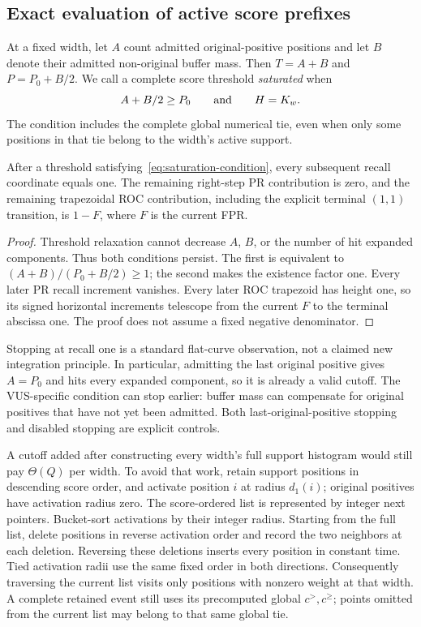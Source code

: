 \subsection{Exact evaluation of active score prefixes}
\label{sec:saturation}
At a fixed width, let $A$ count admitted original-positive positions and let
$B$ denote their admitted non-original buffer mass. Then $T=A+B$ and
$P=P_0+B/2$. We call a complete score threshold \emph{saturated} when
\begin{equation}
 A+B/2\ge P_0\qquad\hbox{and}\qquad H=K_w.
 \label{eq:saturation-condition}
\end{equation}
The condition includes the complete global numerical tie, even when only some
positions in that tie belong to the width's active support.

\begin{lemma}
After a threshold satisfying~\eqref{eq:saturation-condition}, every subsequent
recall coordinate equals one. The remaining right-step PR contribution is
zero, and the remaining trapezoidal ROC contribution, including the explicit
terminal $(1,1)$ transition, is $1-F$, where $F$ is the current FPR.
\end{lemma}
\begin{proof}
Threshold relaxation cannot decrease $A$, $B$, or the number of hit expanded
components. Thus both conditions persist. The first is equivalent to
$(A+B)/(P_0+B/2)\ge1$; the second makes the existence factor one. Every later
PR recall increment vanishes. Every later ROC trapezoid has height one, so
its signed horizontal increments telescope from the current $F$ to the
terminal abscissa one. The proof does not assume a fixed negative denominator.
\end{proof}

Stopping at recall one is a standard flat-curve observation, not a claimed
new integration principle. In particular, admitting the last original
positive gives $A=P_0$ and hits every expanded component, so it is already a
valid cutoff. The VUS-specific condition can stop earlier: buffer mass can
compensate for original positives that have not yet been admitted. Both
last-original-positive stopping and disabled stopping are explicit controls.

A cutoff added after constructing every width's full support histogram would
still pay $\Theta(Q)$ per width. To avoid that work, retain support positions
in descending score order, and activate position $i$ at radius $d_1(i)$;
original positives have activation radius zero. The score-ordered list is
represented by integer next pointers. Bucket-sort activations by their
integer radius. Starting from the full list, delete positions in reverse
activation order and record the two neighbors at each deletion. Reversing
these deletions inserts every position in constant time. Tied activation
radii use the same fixed order in both directions. Consequently traversing
the current list visits only positions with nonzero weight at that width.
A complete retained event still uses its precomputed global $c^>,c^\ge$;
points omitted from the current list may belong to that same global tie.

